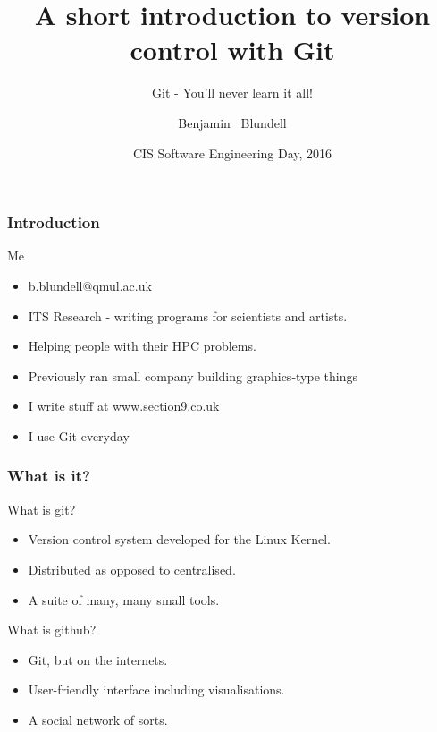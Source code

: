 \documentclass{beamer}
\begin{document}
\title[git]
{A short introduction to version control with Git}
\subtitle{Git - You'll never learn it all!}
\author[Blundell]
{Benjamin ~Blundell}
\date[2016]
{CIS Software Engineering Day, 2016}
\subject{Computer Science}

\frame{\titlepage}


\begin{frame}
  \frametitle{Introduction}
  
  \begin{block}{Me}
    \begin{itemize}  
      \item b.blundell@qmul.ac.uk 
      \item ITS Research - writing programs for scientists and artists.
      \item Helping people with their HPC problems.
      \item Previously ran small company building graphics-type things
      \item I write stuff at www.section9.co.uk
      \item I use Git everyday
    \end{itemize}
  \end{block}

\end{frame}


\begin{frame}
  \frametitle{What is it?}

  \begin{block}{What is git?}
    \begin{itemize}  
      \item Version control system developed for the Linux Kernel. 
      \item Distributed as opposed to centralised.
      \item A suite of many, many small tools.
    \end{itemize}
  \end{block}

  \begin{block}{What is github?}
    \begin{itemize}  
      \item Git, but on the internets.
      \item User-friendly interface including visualisations.
      \item A social network of sorts.
    \end{itemize}
  \end{block}

\end{frame}
\end{document}
